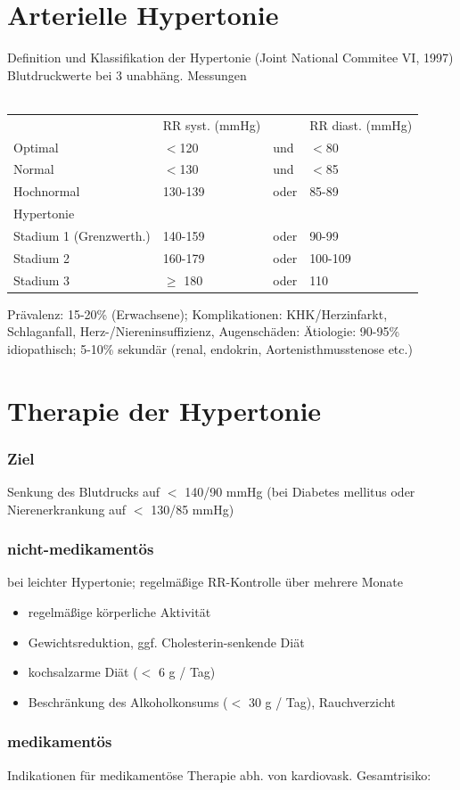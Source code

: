 \documentclass[10pt,a4paper]{report}
\begin{document}
\section{Arterielle Hypertonie}
Definition und Klassifikation der Hypertonie (Joint National Commitee VI, 1997) Blutdruckwerte bei 3 unabhäng. Messungen\\\\
\begin{tabularx}{\textwidth}{XXXX}
&RR syst. (mmHg)&&RR diast. (mmHg)\\
Optimal&$<$120&und&$<$80\\
Normal&$<$130&und&$<$85\\
Hochnormal&130-139&oder&85-89\\
Hypertonie&&&\\
Stadium 1 (Grenzwerth.)&140-159&oder&90-99\\
Stadium 2&160-179&oder&100-109\\
Stadium 3&$\geq$ 180&oder&110\\ 
\end{tabularx}
Prävalenz:  15-20\% (Erwachsene); Komplikationen: KHK/Herzinfarkt, Schlaganfall, Herz-/Niereninsuffizienz, Augenschäden: Ätiologie: 90-95\% idiopathisch; 5-10\% sekundär (renal, endokrin, Aortenisthmusstenose etc.)
\section{Therapie der Hypertonie}
\subsubsection{Ziel} Senkung des Blutdrucks auf $<$ 140/90 mmHg (bei Diabetes mellitus oder Nierenerkrankung auf $<$ 130/85 mmHg)
\subsubsection{nicht-medikamentös} 
bei leichter Hypertonie; regelmäßige RR-Kontrolle über mehrere Monate 
\begin{itemize}
	\item regelmäßige körperliche Aktivität
	\item Gewichtsreduktion, ggf. Cholesterin-senkende Diät
	\item kochsalzarme Diät ($<$ 6 g / Tag)
	\item Beschränkung des Alkoholkonsums ($<$ 30 g / Tag), Rauchverzicht
\end{itemize}
\subsubsection{medikamentös} 
Indikationen für medikamentöse Therapie abh. von kardiovask. Gesamtrisiko:
\end{document}
